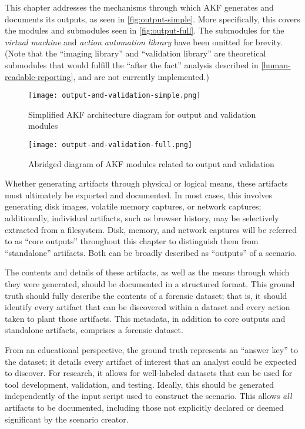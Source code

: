 \hfill\break

This chapter addresses the mechanisms through which AKF generates and
documents its outputs, as seen in \autoref{fig:output-simple}. More
specifically, this covers the modules and submodules seen in
\autoref{fig:output-full}. The submodules for the \emph{virtual machine}
and \emph{action automation library} have been omitted for brevity.
(Note that the ``imaging library'' and ``validation library'' are
theoretical submodules that would fulfill the ``after the fact''
analysis described in \autoref{human-readable-reporting}, and are not currently implemented.)

\begin{figure}[h]
\centering
\texttt{[image: output-and-validation-simple.png]}
\caption{Simplified AKF architecture diagram for output and validation
modules}\label{fig:output-simple}
\end{figure}

\begin{figure}[h]
\centering
\texttt{[image: output-and-validation-full.png]}
\caption{Abridged diagram of AKF modules related to output and
validation}\label{fig:output-full}
\end{figure}

Whether generating artifacts through physical or logical means, these
artifacts must ultimately be exported and documented. In most cases,
this involves generating disk images, volatile memory captures, or
network captures; additionally, individual artifacts, such as browser
history, may be selectively extracted from a filesystem. Disk, memory,
and network captures will be referred to as ``core outputs'' throughout
this chapter to distinguish them from ``standalone'' artifacts. Both can
be broadly described as ``outputs'' of a scenario.

The contents and details of these artifacts, as well as the means
through which they were generated, should be documented in a structured
format. This ground truth should fully describe the contents of a
forensic dataset; that is, it should identify every artifact that can be
discovered within a dataset and every action taken to plant those
artifacts. This metadata, in addition to core outputs and standalone
artifacts, comprises a forensic dataset.

From an educational perspective, the ground truth represents an ``answer
key'' to the dataset; it details every artifact of interest that an
analyst could be expected to discover. For research, it allows for
well-labeled datasets that can be used for tool development, validation,
and testing. Ideally, this should be generated independently of the
input script used to construct the scenario. This allows \emph{all}
artifacts to be documented, including those not explicitly declared or
deemed significant by the scenario creator.

